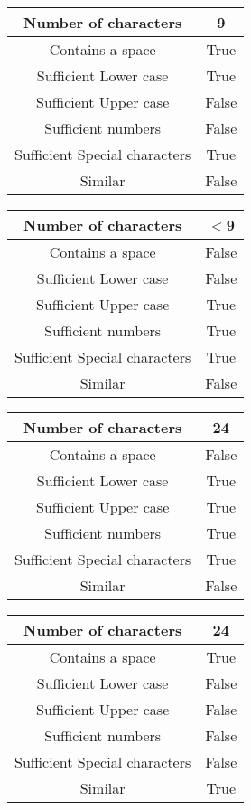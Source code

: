 \documentclass[12pt,letterpaper]{article}
\begin{document}
\begin{table}[h!]
\begin{center}
    \begin{tabular}{||c|c||}
    \hline
	Number of characters & 9 \\
	\hline
	Contains a space & True \\
	\hline
	Sufficient Lower case & True \\
	\hline
	Sufficient Upper case& False \\
	\hline
	Sufficient numbers & False \\
	\hline
	Sufficient Special characters & True \\
	Similar & False \\
    \hline
    \end{tabular}
    
    \begin{tabular}{||c|c||}
    \hline
	Number of characters & $<$9 \\
	\hline
	Contains a space & False \\
	\hline
	Sufficient Lower case & False \\
	\hline
	Sufficient Upper case& True \\
	\hline
	Sufficient numbers & True \\
	\hline
	Sufficient Special characters & True \\
	Similar & False \\
    \hline
    \end{tabular}
    
    \begin{tabular}{||c|c||}
    \hline
	Number of characters & 24 \\
	\hline
	Contains a space & False \\
	\hline
	Sufficient Lower case & True \\
	\hline
	Sufficient Upper case& True \\
	\hline
	Sufficient numbers & True \\
	\hline
	Sufficient Special characters & True \\
	Similar & False \\
    \hline
    \end{tabular}
    
    \begin{tabular}{||c|c||}
    \hline
	Number of characters & 24 \\
	\hline
	Contains a space & True \\
	\hline
	Sufficient Lower case & False \\
	\hline
	Sufficient Upper case& False \\
	\hline
	Sufficient numbers & False \\
	\hline
	Sufficient Special characters & False \\
	Similar & True \\
    \hline
    \end{tabular}

  \end{center}
\end{table}
\end{document}
